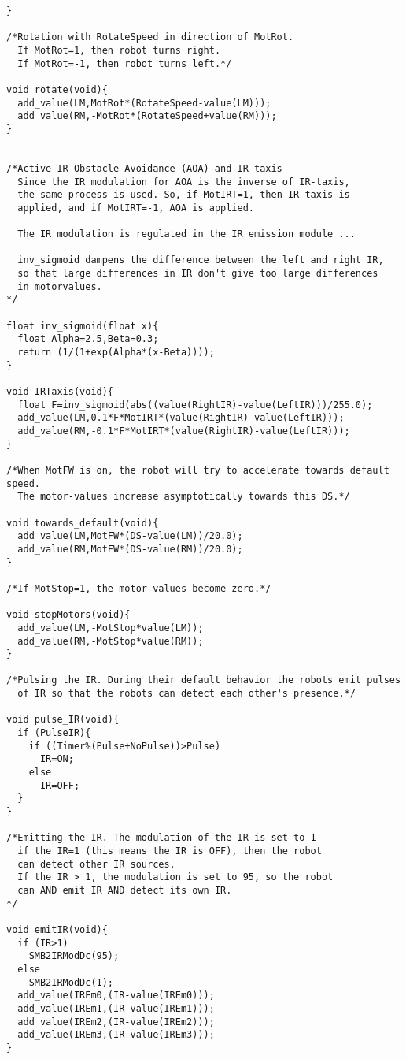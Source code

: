 {\begin{verbatim}
}

/*Rotation with RotateSpeed in direction of MotRot.
  If MotRot=1, then robot turns right. 
  If MotRot=-1, then robot turns left.*/

void rotate(void){
  add_value(LM,MotRot*(RotateSpeed-value(LM)));
  add_value(RM,-MotRot*(RotateSpeed+value(RM)));
}


/*Active IR Obstacle Avoidance (AOA) and IR-taxis
  Since the IR modulation for AOA is the inverse of IR-taxis, 
  the same process is used. So, if MotIRT=1, then IR-taxis is
  applied, and if MotIRT=-1, AOA is applied.

  The IR modulation is regulated in the IR emission module ...
    
  inv_sigmoid dampens the difference between the left and right IR, 
  so that large differences in IR don't give too large differences 
  in motorvalues.
*/

float inv_sigmoid(float x){
  float Alpha=2.5,Beta=0.3;
  return (1/(1+exp(Alpha*(x-Beta))));
}

void IRTaxis(void){
  float F=inv_sigmoid(abs((value(RightIR)-value(LeftIR)))/255.0);
  add_value(LM,0.1*F*MotIRT*(value(RightIR)-value(LeftIR)));
  add_value(RM,-0.1*F*MotIRT*(value(RightIR)-value(LeftIR)));
}

/*When MotFW is on, the robot will try to accelerate towards default speed.
  The motor-values increase asymptotically towards this DS.*/

void towards_default(void){ 	
  add_value(LM,MotFW*(DS-value(LM))/20.0);
  add_value(RM,MotFW*(DS-value(RM))/20.0);
}	

/*If MotStop=1, the motor-values become zero.*/

void stopMotors(void){	
  add_value(LM,-MotStop*value(LM));
  add_value(RM,-MotStop*value(RM));
}

/*Pulsing the IR. During their default behavior the robots emit pulses
  of IR so that the robots can detect each other's presence.*/

void pulse_IR(void){
  if (PulseIR){
    if ((Timer%(Pulse+NoPulse))>Pulse)
      IR=ON;
    else
      IR=OFF;
  }
}

/*Emitting the IR. The modulation of the IR is set to 1 
  if the IR=1 (this means the IR is OFF), then the robot 
  can detect other IR sources.
  If the IR > 1, the modulation is set to 95, so the robot 
  can AND emit IR AND detect its own IR.
*/

void emitIR(void){	
  if (IR>1)
    SMB2IRModDc(95);
  else
    SMB2IRModDc(1);
  add_value(IREm0,(IR-value(IREm0)));
  add_value(IREm1,(IR-value(IREm1)));
  add_value(IREm2,(IR-value(IREm2)));
  add_value(IREm3,(IR-value(IREm3)));
}



\end{verbatim}}
